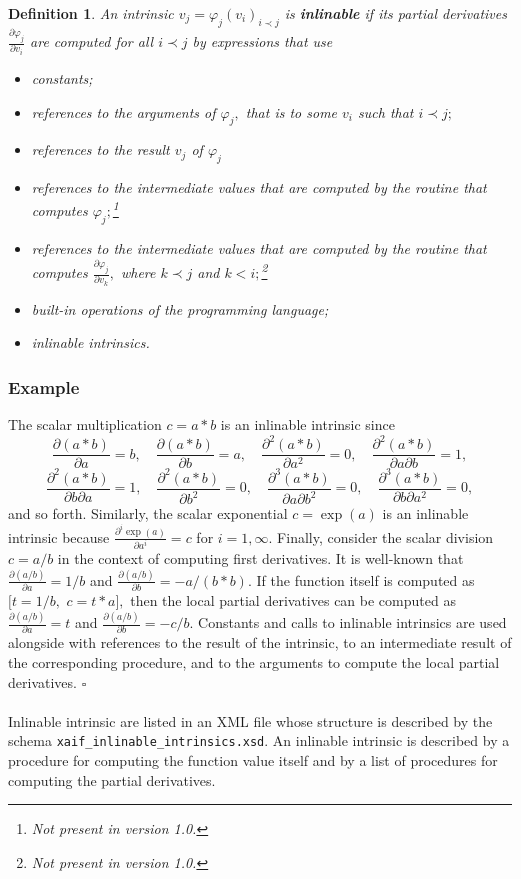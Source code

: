 \documentclass{book}
\newtheorem{Def}{Definition}
\begin{document}
\begin{Def} \label{def:inlinable_intrinsic}
An intrinsic $v_j = \varphi_j(v_i)_{i \prec j}$ 
is {\bf inlinable} if its partial derivatives 
$\frac{\partial \varphi_j}{\partial v_i}$
are computed for all $i \prec j$ by expressions that use 
\begin{itemize}
\item constants;
\item references to the arguments of $\varphi_j,$ that is to some
$v_i$ such that $i \prec j;$
\item references to the result $v_j$ of $\varphi_j$ 
\item references to the intermediate values that are
computed by the routine that computes $\varphi_j;$\footnote[1]{Not present in version 1.0.}
\item references to the intermediate values that are
computed by the routine that computes 
$\frac{\partial \varphi_j}{\partial v_k},$ where $k \prec j$ and
$k < i;$\footnote[1]{Not present in version 1.0.}
\item built-in operations of the programming language;
\item inlinable intrinsics.
\end{itemize}
\end{Def}

\subsubsection{Example}
The scalar multiplication $c=a*b$ 
is an inlinable 
intrinsic since
$$
\frac{\partial (a*b)}{\partial a} = b, \quad
\frac{\partial (a*b)}{\partial b} = a, \quad
\frac{\partial^2 (a*b)}{\partial a^2} = 0, \quad
\frac{\partial^2 (a*b)}{\partial a \partial b} = 1, 
$$
$$
\frac{\partial^2 (a*b)}{\partial b \partial a} = 1, \quad
\frac{\partial^2 (a*b)}{\partial b^2} = 0, \quad
\frac{\partial^3 (a*b)}{\partial a \partial b^2} = 0, \quad
\frac{\partial^3 (a*b)}{\partial b \partial a^2} = 0, 
$$
and so forth.
Similarly, 
the scalar exponential $c=\exp(a)$ 
is an inlinable intrinsic because 
$ \frac{\partial^i \exp(a)}{\partial a^i} = c $
for $i=1,\infty.$ 
Finally, consider the scalar division
$c=a/b$ in the context of
computing first derivatives. It is well-known that
$ \frac{\partial (a/b)}{\partial a} = 1/b$ and
$\frac{\partial (a/b)}{\partial b} = -a/(b*b).$ If the function
itself is computed as 
$[t=1/b,$ $c=t*a],$
then the local partial derivatives can be computed as
$ \frac{\partial (a/b)}{\partial a} = t$ and
$\frac{\partial (a/b)}{\partial b} = -c/b.$ Constants and 
calls to inlinable intrinsics are used alongside with references to
the result of the intrinsic, to an intermediate result of
the corresponding procedure, and to the arguments to compute
the local partial derivatives. $\square$ \\
\\
Inlinable intrinsic are listed in an XML file whose structure
is described by the schema {\tt xaif\_inlinable\_intrinsics.xsd}.
An inlinable intrinsic is described by a procedure for computing
the function value itself and by a list of procedures for computing
the partial derivatives.
\end{document}
